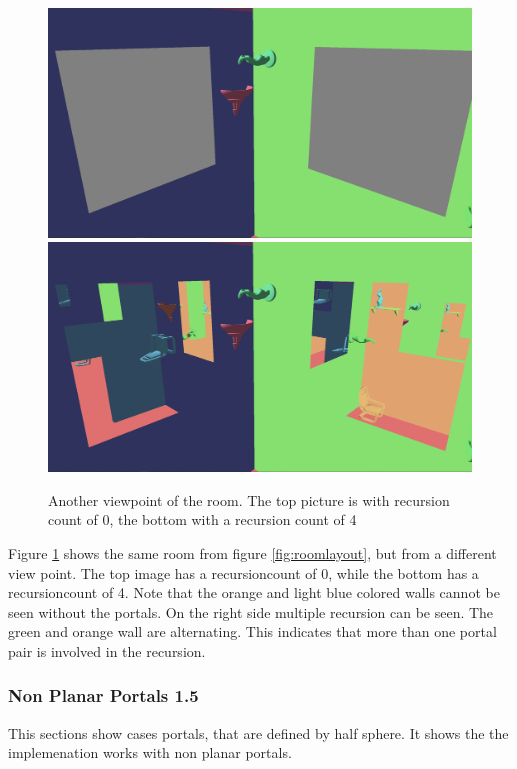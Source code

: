 \begin{figure}[H]
	\includegraphics[width=\linewidth]{images/roomportalsr0.png}
	\includegraphics[width=\linewidth]{images/roomportals.png}
	\caption{Another viewpoint of the room.  The top picture is with recursion count of 0, the bottom with a recursion count of 4}
	\label{fig:room}
\end{figure}


Figure \ref{fig:room} shows the same room from figure \ref{fig:roomlayout}, but from a different view point. The top image has a \gls{recursioncount} of 0, while the bottom has a \gls{recursioncount} of 4. Note that the orange and light blue colored walls cannot be seen without the portals. On the right side multiple recursion can be seen. The green and orange wall are alternating. This indicates that more than one portal pair is involved in the recursion.

\subsubsection{Non Planar Portals 1.5}
\label{section:nonplanar}

This sections show cases portals, that are defined by half sphere. It shows the the implemenation works with non planar portals.

